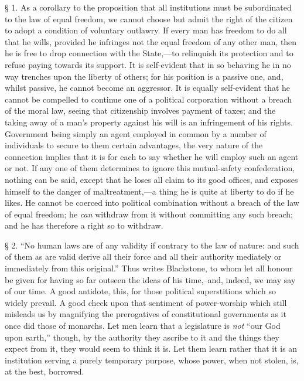 \documentclass[oneside]{book}
\begin{document}
\S{} 1. As a corollary to the proposition that all institutions
must be subordinated to the law of equal freedom, we cannot
choose but admit the right of the citizen to adopt a condition of
voluntary outlawry. If every man has freedom to do all that
he wills, provided he infringes not the equal freedom of any
other man, then he is free to drop connection with the State,---to
relinquish its protection and to refuse paying towards its
support. It is self-evident that in so behaving he in no way
trenches upon the liberty of others; for his position is a passive
one, and, whilst passive, he cannot become an aggressor. It is
equally self-evident that he cannot be compelled to continue one
of a political corporation without a breach of the moral law,
seeing that citizenship involves payment of taxes; and the
taking away of a man's property against his will is an infringement
of his rights. Government being simply an agent employed
in common by a number of individuals to secure to them certain
advantages, the very nature of the connection implies that it is
for each to say whether he will employ such an agent or not.
If any one of them determines to ignore this mutual-safety
confederation, nothing can be said, except that he loses all claim
to its good offices, and exposes himself to the danger of maltreatment,---a
thing he is quite at liberty to do if he likes. He
cannot be coerced into political combination without a breach of
the law of equal freedom; he \textit{can} withdraw from it without
committing any such breach; and he has therefore a right so to
withdraw.


\S{} 2. ``No human laws are of any validity if contrary to
the law of nature: and such of them as are valid derive all their
force and all their authority mediately or immediately from this
\newpage\noindent
original.'' Thus writes Blackstone, to whom let all honour be
given for having so far outseen the ideas of his time,--and,
indeed, we may say of our time. A good antidote, this, for those
political superstitions which so widely prevail. A good check
upon that sentiment of power-worship which still misleads us by
magnifying the prerogatives of constitutional governments as it
once did those of monarchs. Let men learn that a legislature is
\textit{not} ``our God upon earth,'' though, by the authority they ascribe
to it and the things they expect from it, they would seem to
think it is. Let them learn rather that it is an institution
serving a purely temporary purpose, whose power, when not
stolen, is, at the best, borrowed.
\end{document}
